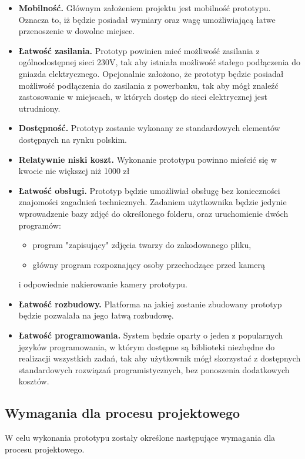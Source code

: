 \documentclass[a4paper,12pt,reqno]{article}
\begin{document}
\begin{itemize}
	\item \textbf{Mobilność.} Głównym założeniem projektu jest mobilność prototypu. Oznacza to, iż będzie posiadał wymiary oraz wagę umożliwiającą łatwe przenoszenie w dowolne miejsce.
	\item \textbf{Łatwość zasilania.} Prototyp powinien mieć możliwość zasilania z ogólnodostępnej sieci 230V, tak aby istniała możliwość stałego podłączenia do gniazda elektrycznego. Opcjonalnie założono, że prototyp będzie posiadał możliwość podłączenia do zasilania z powerbanku, tak aby mógł znaleźć zastosowanie w miejscach, w których dostęp do sieci elektrycznej jest utrudniony.
	\item \textbf{Dostępność.} Prototyp zostanie wykonany ze standardowych elementów dostępnych na rynku polskim.
	\item \textbf{Relatywnie niski koszt.} Wykonanie prototypu powinno mieścić się w kwocie nie większej niż 1000 zł
	\item \textbf{Łatwość obsługi.} Prototyp będzie umożliwiał obsługę bez konieczności znajomości zagadnień technicznych. Zadaniem użytkownika będzie jedynie wprowadzenie bazy zdjęć do określonego folderu, oraz uruchomienie dwóch programów:
		\begin{itemize}
			\item program "zapisujący" zdjęcia twarzy do zakodowanego pliku,
			\item główny program rozpoznający osoby przechodzące przed kamerą
		\end{itemize}
	i odpowiednie nakierowanie kamery prototypu.
	\item \textbf{Łatwość rozbudowy.} Platforma na jakiej zostanie zbudowany prototyp będzie pozwalała na jego łatwą rozbudowę.
	\item \textbf{Łatwość programowania.} System będzie oparty o jeden z popularnych języków programowania, w którym dostępne są biblioteki niezbędne do realizacji wszystkich zadań, tak aby użytkownik mógł skorzystać z dostępnych standardowych rozwiązań programistycznych, bez ponoszenia dodatkowych kosztów.
\end{itemize}

\subsection{Wymagania dla procesu projektowego}

W celu wykonania prototypu zostały określone następujące wymagania dla procesu projektowego.
\end{document}
